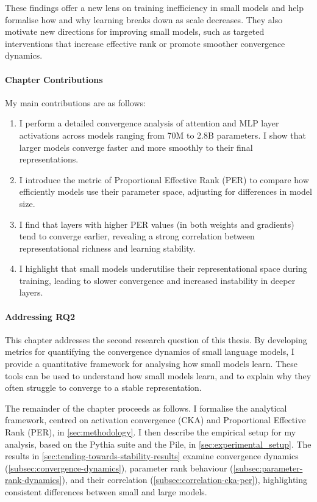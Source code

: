 These findings offer a new lens on training inefficiency in small models and help formalise how and why learning breaks down as scale decreases. They also motivate new directions for improving small models, such as targeted interventions that increase effective rank or promote smoother convergence dynamics.

\paragraph{Chapter Contributions}
My main contributions are as follows:
\begin{enumerate}
    \item I perform a detailed convergence analysis of attention and MLP layer activations across models ranging from 70M to 2.8B parameters. I show that larger models converge faster and more smoothly to their final representations.

    \item I introduce the metric of Proportional Effective Rank (PER) to compare how efficiently models use their parameter space, adjusting for differences in model size.

    \item I find that layers with higher PER values (in both weights and gradients) tend to converge earlier, revealing a strong correlation between representational richness and learning stability.

    \item I highlight that small models underutilise their representational space during training, leading to slower convergence and increased instability in deeper layers.
\end{enumerate}

\paragraph{Addressing RQ2} This chapter addresses the second research question of this thesis. By developing metrics for quantifying the convergence dynamics of small language models, I provide a quantitative framework for analysing how small models learn. These tools can be used to understand how small models learn, and to explain why they often struggle to converge to a stable representation.

\vspace{1em}

The remainder of the chapter proceeds as follows. I formalise the analytical framework, centred on activation convergence (CKA) and Proportional Effective Rank (PER), in \cref{sec:methodology}. I then describe the empirical setup for my analysis, based on the Pythia suite and the Pile, in \cref{sec:experimental_setup}. The results in \cref{sec:tending-towards-stability-results} examine convergence dynamics (\cref{subsec:convergence-dynamics}), parameter rank behaviour (\cref{subsec:parameter-rank-dynamics}), and their correlation (\cref{subsec:correlation-cka-per}), highlighting consistent differences between small and large models.

